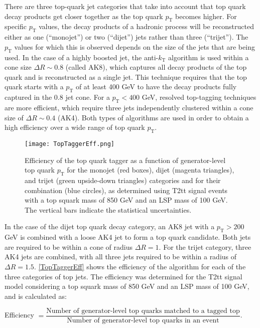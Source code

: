 There are three top-quark jet categories that take into account that top quark decay products get closer together as the top quark $p_\text{T}$ becomes higher. For specific $p_\text{T}$ values, the decay products of a hadronic process will be reconstructed either as one (``monojet'') or two (``dijet'') jets rather than three (``trijet''). The $p_\text{T}$ values for which this is observed depends on the size of the jets that are being used. In the case of a highly boosted jet, the anti-$k_\text{T}$ algorithm is used within a cone size $\Delta R \sim 0.8$ (called AK8), which captures all decay products of the top quark and is reconstructed as a single jet. This technique requires that the top quark starts with a $p_\text{T}$ of at least 400 GeV to have the decay products fully captured in the 0.8 jet cone. For a $p_\text{T} < 400$ GeV, resolved top-tagging techniques are more efficient, which require three jets independently clustered within a cone size of $\Delta R \sim 0.4$ (AK4). Both types of algorithms are used in order to obtain a high efficiency over a wide range of top quark $p_\text{T}$.

\begin{figure}[H]
\begin{center}
\texttt{[image: TopTaggerEff.png]} 
\caption{Efficiency of the top quark tagger as a function of generator-level top quark $p_\text{T}$ for the monojet (red boxes), dijet (magenta triangles), and trijet (green upside-down triangles) categories and for their combination (blue circles), as determined using T2tt signal events with a top squark mass of 850 GeV and an LSP mass of 100 GeV. The vertical bars indicate the statistical uncertainties.}
\label{TopTaggerEff} 
\end{center}
\end{figure}

In the case of the dijet top quark decay category, an AK8 jet with a $p_\text{T} > 200$ GeV is combined with a loose AK4 jet to form a top quark candidate. Both jets are required to be within a cone of radius $\Delta R = 1$. For the trijet category, three AK4 jets are combined, with all three jets required to be within a radius of $\Delta R = 1.5$. \autoref{TopTaggerEff} shows the efficiency of the algorithm for each of the three categories of top jets. The efficiency was determined for the T2tt signal model considering a top squark mass of 850 GeV and an LSP mass of 100 GeV, and is calculated as:
\begin{center}
Efficiency $= \dfrac{\text{Number of generator-level top quarks matched to a tagged top}}{\text{Number of generator-level top quarks in an event}}$.
\end{center}

